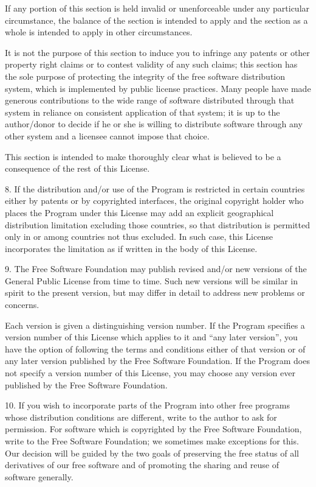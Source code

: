 If any portion of this section is held invalid or unenforceable under
any particular circumstance, the balance of the section is intended to
apply and the section as a whole is intended to apply in other
circumstances.

It is not the purpose of this section to induce you to infringe any
patents or other property right claims or to contest validity of any
such claims; this section has the sole purpose of protecting the
integrity of the free software distribution system, which is
implemented by public license practices.  Many people have made
generous contributions to the wide range of software distributed
through that system in reliance on consistent application of that
system; it is up to the author/donor to decide if he or she is willing
to distribute software through any other system and a licensee cannot
impose that choice.

This section is intended to make thoroughly clear what is believed to
be a consequence of the rest of this License.

  8. If the distribution and/or use of the Program is restricted in
certain countries either by patents or by copyrighted interfaces, the
original copyright holder who places the Program under this License
may add an explicit geographical distribution limitation excluding
those countries, so that distribution is permitted only in or among
countries not thus excluded.  In such case, this License incorporates
the limitation as if written in the body of this License.

  9. The Free Software Foundation may publish revised and/or new versions
of the General Public License from time to time.  Such new versions will
be similar in spirit to the present version, but may differ in detail to
address new problems or concerns.

Each version is given a distinguishing version number.  If the Program
specifies a version number of this License which applies to it and ``any
later version'', you have the option of following the terms and conditions
either of that version or of any later version published by the Free
Software Foundation.  If the Program does not specify a version number of
this License, you may choose any version ever published by the Free Software
Foundation.

  10. If you wish to incorporate parts of the Program into other free
programs whose distribution conditions are different, write to the author
to ask for permission.  For software which is copyrighted by the Free
Software Foundation, write to the Free Software Foundation; we sometimes
make exceptions for this.  Our decision will be guided by the two goals
of preserving the free status of all derivatives of our free software and
of promoting the sharing and reuse of software generally.

